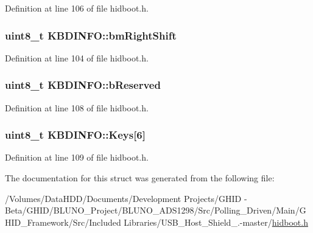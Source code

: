 \-Definition at line 106 of file hidboot.\-h.

\hypertarget{struct_k_b_d_i_n_f_o_acf82b510a3676bf60c122ad500c216c9}{
\subsubsection[{bm\-Right\-Shift}]{\setlength{\rightskip}{0pt plus 5cm}uint8\-\_\-t {\bf \-K\-B\-D\-I\-N\-F\-O\-::bm\-Right\-Shift}}}\label{struct_k_b_d_i_n_f_o_acf82b510a3676bf60c122ad500c216c9}


\-Definition at line 104 of file hidboot.\-h.

\hypertarget{struct_k_b_d_i_n_f_o_a91061aae6b2f52c94b1ed734def585a0}{
\subsubsection[{b\-Reserved}]{\setlength{\rightskip}{0pt plus 5cm}uint8\-\_\-t {\bf \-K\-B\-D\-I\-N\-F\-O\-::b\-Reserved}}}\label{struct_k_b_d_i_n_f_o_a91061aae6b2f52c94b1ed734def585a0}


\-Definition at line 108 of file hidboot.\-h.

\hypertarget{struct_k_b_d_i_n_f_o_a942e4eb5551fbe8958e858057391dd2d}{
\subsubsection[{\-Keys}]{\setlength{\rightskip}{0pt plus 5cm}uint8\-\_\-t {\bf \-K\-B\-D\-I\-N\-F\-O\-::\-Keys}\mbox{[}6\mbox{]}}}\label{struct_k_b_d_i_n_f_o_a942e4eb5551fbe8958e858057391dd2d}


\-Definition at line 109 of file hidboot.\-h.



\-The documentation for this struct was generated from the following file\-:\begin{DoxyCompactItemize}
\item 
/\-Volumes/\-Data\-H\-D\-D/\-Documents/\-Development Projects/\-G\-H\-I\-D -\/ Beta/\-G\-H\-I\-D/\-B\-L\-U\-N\-O\-\_\-\-Project/\-B\-L\-U\-N\-O\-\_\-\-A\-D\-S1298/\-Src/\-Polling\-\_\-\-Driven/\-Main/\-G\-H\-I\-D\-\_\-\-Framework/\-Src/\-Included Libraries/\-U\-S\-B\-\_\-\-Host\-\_\-\-Shield\-\_.-\/master/\hyperlink{hidboot_8h}{hidboot.\-h}\end{DoxyCompactItemize}
